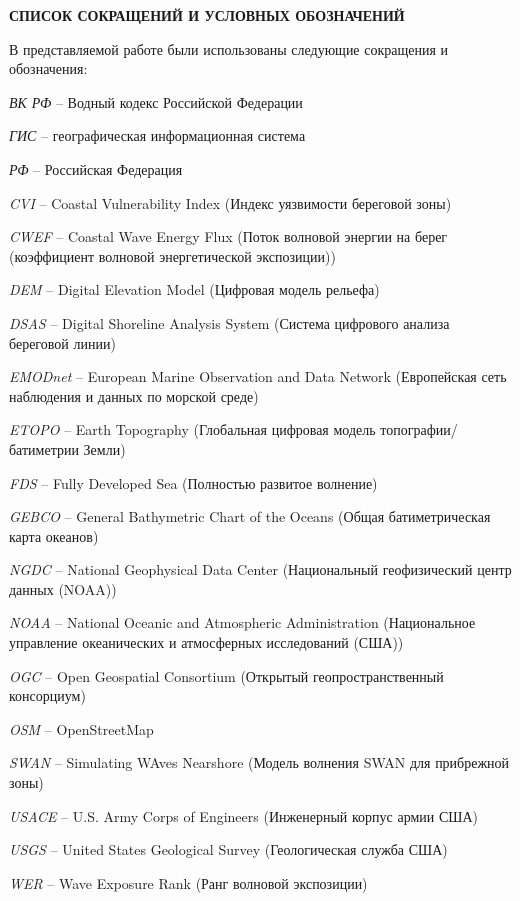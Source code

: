 \begin{center}
  \textbf{СПИСОК СОКРАЩЕНИЙ И УСЛОВНЫХ ОБОЗНАЧЕНИЙ}
\end{center}

В представляемой работе были использованы следующие сокращения и обозначения:

\vspace{1em}
\noindent \textit{ВК РФ} -- Водный кодекс Российской Федерации
    
\noindent \textit{ГИС} -- географическая информационная система


\noindent \textit{РФ} -- Российская Федерация
    
\noindent \textit{CVI} -- Coastal Vulnerability Index (Индекс уязвимости береговой зоны)

\noindent \textit{CWEF} -- Coastal Wave Energy Flux  (Поток волновой энергии на берег (коэффициент волновой энергетической экспозиции))

\noindent \textit{DEM} -- Digital Elevation Model (Цифровая модель рельефа)
    
\noindent \textit{DSAS} -- Digital Shoreline Analysis System (Система цифрового анализа береговой линии)

\noindent \textit{EMODnet} -- European Marine Observation and Data Network (Европейская сеть наблюдения и данных по морской среде)

\noindent \textit{ETOPO} -- Earth Topography (Глобальная цифровая модель топографии/батиметрии Земли)

\noindent \textit{FDS} -- Fully Developed Sea (Полностью развитое волнение)

\noindent \textit{GEBCO} -- General Bathymetric Chart of the Oceans (Общая батиметрическая карта океанов)

\noindent \textit{NGDC} -- National Geophysical Data Center (Национальный геофизический центр данных (NOAA))

\noindent \textit{NOAA} -- National Oceanic and Atmospheric Administration (Национальное управление океанических и атмосферных исследований (США))

\noindent \textit{OGC} -- Open Geospatial Consortium (Открытый геопространственный консорциум)

\noindent \textit{OSM} -- OpenStreetMap

\noindent \textit{SWAN} -- Simulating WAves Nearshore (Модель волнения SWAN для прибрежной зоны)

\noindent \textit{USACE} -- U.S. Army Corps of Engineers (Инженерный корпус армии США)

\noindent \textit{USGS} -- United States Geological Survey (Геологическая служба США)

\noindent \textit{WER} -- Wave Exposure Rank (Ранг волновой экспозиции)
